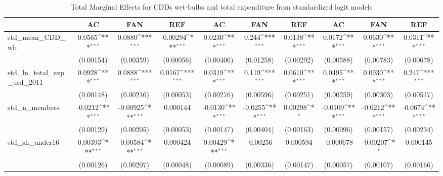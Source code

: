 \begin{table}[htbp]\centering\footnotesize{
\def\sym#1{\ifmmode^{#1}\else\(^{#1}\)\fi}
\caption{Total Marginal Effects for CDDs wet-bulbs and total expenditure from standardized logit models \label{table_S7}}
\begin{tabular}{l*{9}{c}}
\hline\hline
            &\multicolumn{1}{c}{AC}&\multicolumn{1}{c}{FAN}&\multicolumn{1}{c}{REF}&\multicolumn{1}{c}{AC}&\multicolumn{1}{c}{FAN}&\multicolumn{1}{c}{REF}&\multicolumn{1}{c}{AC}&\multicolumn{1}{c}{FAN}&\multicolumn{1}{c}{REF}\\
\hline
std_mean_CDD_wb&      0.0565\sym{***}&      0.0880\sym{***}&    -0.00294\sym{***}&      0.0230\sym{***}&       0.244\sym{***}&      0.0138\sym{***}&      0.0172\sym{***}&      0.0630\sym{***}&      0.0311\sym{***}\\
            &   (0.00154)         &   (0.00359)         &   (0.00056)         &   (0.00406)         &   (0.01258)         &   (0.00292)         &   (0.00588)         &   (0.00783)         &   (0.00678)         \\
std_ln_total_exp_usd_2011&      0.0928\sym{***}&      0.0888\sym{***}&      0.0167\sym{***}&      0.0319\sym{***}&       0.119\sym{***}&      0.0610\sym{***}&      0.0495\sym{***}&      0.0930\sym{***}&       0.247\sym{***}\\
            &   (0.00148)         &   (0.00216)         &   (0.00053)         &   (0.00276)         &   (0.00596)         &   (0.00251)         &   (0.00259)         &   (0.00303)         &   (0.00517)         \\
std_n_members&     -0.0212\sym{***}&    -0.00925\sym{***}&    0.000144         &     -0.0130\sym{***}&     -0.0255\sym{***}&     0.00298\sym{*}  &     -0.0109\sym{***}&     -0.0212\sym{***}&     -0.0674\sym{***}\\
            &   (0.00129)         &   (0.00205)         &   (0.00053)         &   (0.00147)         &   (0.00404)         &   (0.00163)         &   (0.00096)         &   (0.00157)         &   (0.00234)         \\
std_sh_under16&     0.00393\sym{***}&    -0.00584\sym{***}&    0.000424         &     0.00429\sym{***}&    -0.00256         &    0.000594         &   -0.000678         &    -0.00207\sym{*}  &    0.000145         \\
            &   (0.00126)         &   (0.00207)         &   (0.00048)         &   (0.00089)         &   (0.00336)         &   (0.00147)         &   (0.00057)         &   (0.00107)         &   (0.00166)         \\

\end{tabular}}
\end{table}
